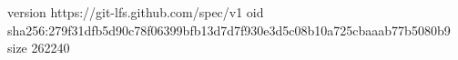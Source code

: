 version https://git-lfs.github.com/spec/v1
oid sha256:279f31dfb5d90c78f06399bfb13d7d7f930e3d5c08b10a725cbaaab77b5080b9
size 262240
